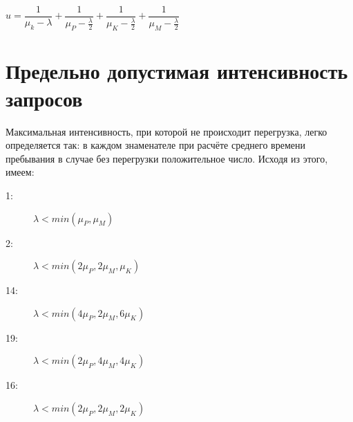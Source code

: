 \documentclass[12pt, a4paper] {ncc}
\begin{document}
			$u = \dfrac {1} {\mu_k - \lambda} + \dfrac {1} {\mu_P - \frac{\lambda}{2}} + \dfrac {1} {\mu_K - \frac {\lambda}{2}} + \dfrac {1}{\mu_M - \frac {\lambda}{2}}$



\section{Предельно допустимая интенсивность запросов}


Максимальная интенсивность, при которой не происходит перегрузка, легко
определяется так: в каждом знаменателе при расчёте среднего времени
пребывания в случае без перегрузки положительное число. Исходя из
 этого, имеем:

	\begin{description}
		\item[1:]  $\lambda < min(\mu_P, \mu_M)$
		\item[2:]  $\lambda < min(2\mu_P, 2\mu_M, \mu_K)$
		\item[14:] $\lambda < min(4\mu_P, 2\mu_M, 6\mu_K)$
		\item[19:] $\lambda < min(2\mu_P, 4\mu_M, 4\mu_K)$
		\item[16:] $\lambda < min(2\mu_P, 2\mu_M, 2\mu_K)$
	\end{description}
\end{document}
